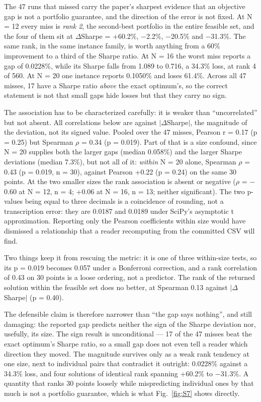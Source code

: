 \documentclass[journal]{IEEEtran}
\begin{document}
The 47 runs that missed carry the paper's sharpest evidence that an objective gap is not a portfolio guarantee, and the direction of the error is not fixed. At N = 12 every miss is \textit{rank 2}, the second-best portfolio in the entire feasible set, and the four of them sit at $\Delta$Sharpe = +60.2\%, $-$2.2\%, $-$20.5\% and $-$31.3\%. The same rank, in the same instance family, is worth anything from a 60\% improvement to a third of the Sharpe ratio. At N = 16 the worst miss reports a gap of 0.0228\%, while its Sharpe falls from 1.089 to 0.716, a 34.3\% loss, at rank 4 of 560. At N = 20 one instance reports 0.1050\% and loses 61.4\%. Across all 47 misses, 17 have a Sharpe ratio \textit{above} the exact optimum's, so the correct statement is not that small gaps hide losses but that they carry no sign.


The association has to be characterized carefully: it is weaker than ``uncorrelated'' but not absent. All correlations below are against $|$$\Delta$Sharpe$|$, the magnitude of the deviation, not its signed value. Pooled over the 47 misses, Pearson r = 0.17 (p = 0.25) but Spearman $\rho$ = 0.34 (p = 0.019). Part of that is a size confound, since N = 20 supplies both the larger gaps (median 0.058\%) and the larger Sharpe deviations (median 7.3\%), but not all of it: \textit{within} N = 20 alone, Spearman $\rho$ = 0.43 (p = 0.019, n = 30), against Pearson +0.22 (p = 0.24) on the same 30 points. At the two smaller sizes the rank association is absent or negative ($\rho$ = $-$0.60 at N = 12, n = 4; +0.06 at N = 16, n = 13; neither significant). The two p-values being equal to three decimals is a coincidence of rounding, not a transcription error: they are 0.0187 and 0.0189 under SciPy's asymptotic t approximation. Reporting only the Pearson coefficients within size would have dismissed a relationship that a reader recomputing from the committed CSV will find.


Two things keep it from rescuing the metric: it is one of three within-size tests, so its p = 0.019 becomes 0.057 under a Bonferroni correction, and a rank correlation of 0.43 on 30 points is a loose ordering, not a predictor. The rank of the returned solution within the feasible set does no better, at Spearman 0.13 against $|$$\Delta$Sharpe$|$ (p = 0.40).


The defensible claim is therefore narrower than ``the gap says nothing'', and still damaging: the reported gap predicts neither the sign of the Sharpe deviation nor, usefully, its size. The sign result is unconditional --- 17 of the 47 misses beat the exact optimum's Sharpe ratio, so a small gap does not even tell a reader which direction they moved. The magnitude survives only as a weak rank tendency at one size, next to individual pairs that contradict it outright: 0.0228\% against a 34.3\% loss, and four solutions of identical rank spanning +60.2\% to $-$31.3\%. A quantity that ranks 30 points loosely while mispredicting individual ones by that much is not a portfolio guarantee, which is what Fig.~\ref{fig:S7} shows directly.
\end{document}
